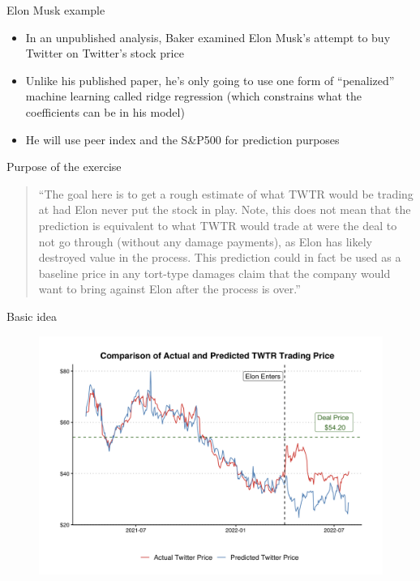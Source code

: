 \documentclass{beamer}
\begin{document}
\begin{frame}{Elon Musk example}

\begin{itemize}
\item In an unpublished analysis, Baker examined Elon Musk's attempt to buy Twitter on Twitter's stock price
\item Unlike his published paper, he's only going to use one form of ``penalized'' machine learning called ridge regression (which constrains what the coefficients can be in his model)
\item He will use peer index and the S\&P500 for prediction purposes
\end{itemize}

\end{frame}

\begin{frame}{Purpose of the exercise}

\begin{quote}
``The goal here is to get a rough estimate of what TWTR would be trading at had Elon never put the stock in play. Note, this does not mean that the prediction is equivalent to what TWTR would trade at were the deal to not go through (without any damage payments), as Elon has likely destroyed value in the process. This prediction could in fact be used as a baseline price in any tort-type damages claim that the company would want to bring against Elon after the process is over.''
\end{quote}

\end{frame}

\begin{frame}{Basic idea}

\begin{figure}
\includegraphics[scale=0.35]{./lecture_includes/baker_gelbach_3}
\end{figure}
\end{frame}
\end{document}
